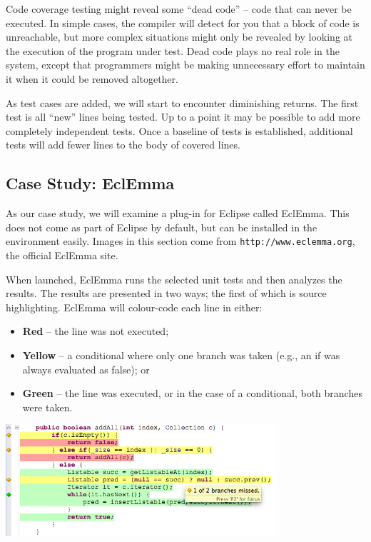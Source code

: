 Code coverage testing might reveal some ``dead code'' -- code that can never be executed. In simple cases, the compiler will detect for you that a block of code is unreachable, but more complex situations might only be revealed by looking at the execution of the program under test. Dead code plays no real role in the system, except that programmers might be making unnecessary effort to maintain it when it could be removed altogether. 

As test cases are added, we will start to encounter diminishing returns. The first test is all ``new'' lines being tested. Up to a point it may be possible to add more completely independent tests. Once a baseline of tests is established, additional tests will add fewer lines to the body of covered lines. 

\subsection*{Case Study: EclEmma}
As our case study, we will examine a plug-in for Eclipse called EclEmma. This does not come as part of Eclipse by default, but can be installed in the environment easily. Images in this section come from \texttt{http://www.eclemma.org}, the official EclEmma site.

When launched, EclEmma runs the selected unit tests and then analyzes the results. The results are presented in two ways; the first of which is source highlighting. EclEmma will colour-code each line in either:
\begin{itemize}
	\item \textbf{Red} -- the line was not executed;
	\item \textbf{Yellow} -- a conditional where only one branch was taken (e.g., an if was always evaluated as false); or
	\item \textbf{Green} -- the line was executed, or in the case of a conditional, both branches were taken.
\end{itemize}

\begin{center}
	\includegraphics[width=0.75\textwidth]{images/annotations.png}
\end{center}

